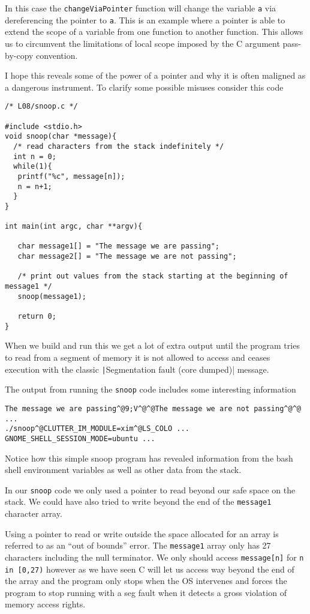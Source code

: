 In this case the \texttt{changeViaPointer} function will change the variable \texttt{a} via dereferencing the pointer to \texttt{a}. This is an example where a pointer is able to extend the scope of a variable from one function to another function. This allows us to circumvent the limitations of local scope imposed by the C argument pass-by-copy convention. 

I hope this reveals some of the power of a pointer and why it is often maligned as a dangerous instrument. To clarify some possible misuses consider this code

\begin{verbatim}
/* L08/snoop.c */

#include <stdio.h>
void snoop(char *message){
  /* read characters from the stack indefinitely */
  int n = 0;
  while(1){
   printf("%c", message[n]);
   n = n+1;
  }
}

int main(int argc, char **argv){

   char message1[] = "The message we are passing";
   char message2[] = "The message we are not passing";
   
   /* print out values from the stack starting at the beginning of message1 */
   snoop(message1);
 
   return 0;
}
\end{verbatim}

When we build and run this we get a lot of extra output until the program tries to read from a segment of memory it is not allowed to access and ceases execution with the classic \texttt|Segmentation fault (core dumped)| message. 

The output from running the \texttt{snoop} code includes some interesting information
\begin{verbatim}
The message we are passing^@9;V^@^@The message we are not passing^@^@ ...
./snoop^@CLUTTER_IM_MODULE=xim^@LS_COLO ...
GNOME_SHELL_SESSION_MODE=ubuntu ...
\end{verbatim}
Notice how this simple snoop program has revealed information from the bash shell environment variables as well as other data from the stack.

In our \texttt{snoop} code we only used a pointer to read beyond our safe space on the stack. We could have also tried to write beyond the end of the \texttt{message1} character array. 

Using a pointer to read or write outside the space allocated for an array is referred to as an ``out of bounds'' error. The \texttt{message1} array only has 27 characters including the null terminator. We only should access \texttt{message[n]}  for \texttt{n in [0,27)} however as we have seen C will let us access way beyond the end of the array and the program only stops when the OS intervenes and forces the program to stop running with a seg fault when it detects a gross violation of memory access rights.

